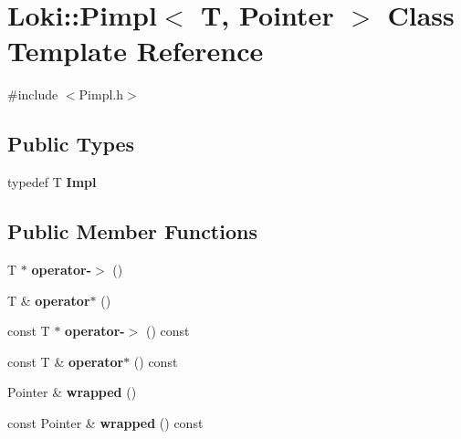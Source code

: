 \hypertarget{classLoki_1_1Pimpl}{}\section{Loki\+:\+:Pimpl$<$ T, Pointer $>$ Class Template Reference}
\label{classLoki_1_1Pimpl}


{\ttfamily \#include $<$Pimpl.\+h$>$}

\subsection*{Public Types}
\begin{DoxyCompactItemize}
\item 
\hypertarget{classLoki_1_1Pimpl_a6ef8111d61b6d3709d8115d8178c8549}{}typedef T {\bfseries Impl}\label{classLoki_1_1Pimpl_a6ef8111d61b6d3709d8115d8178c8549}

\end{DoxyCompactItemize}
\subsection*{Public Member Functions}
\begin{DoxyCompactItemize}
\item 
\hypertarget{classLoki_1_1Pimpl_aa954861b02538f823fa9c63dbe62f096}{}T $\ast$ {\bfseries operator-\/$>$} ()\label{classLoki_1_1Pimpl_aa954861b02538f823fa9c63dbe62f096}

\item 
\hypertarget{classLoki_1_1Pimpl_a2db5a89ac069f09042f17d5c9109fc43}{}T \& {\bfseries operator$\ast$} ()\label{classLoki_1_1Pimpl_a2db5a89ac069f09042f17d5c9109fc43}

\item 
\hypertarget{classLoki_1_1Pimpl_ac1345d40155cb9979741521a9c95282d}{}const T $\ast$ {\bfseries operator-\/$>$} () const \label{classLoki_1_1Pimpl_ac1345d40155cb9979741521a9c95282d}

\item 
\hypertarget{classLoki_1_1Pimpl_a4117838ba4777b52e717a4155404ea2d}{}const T \& {\bfseries operator$\ast$} () const \label{classLoki_1_1Pimpl_a4117838ba4777b52e717a4155404ea2d}

\item 
\hypertarget{classLoki_1_1Pimpl_ae4887f38f36feeb25cf1d9ed5e253a45}{}Pointer \& {\bfseries wrapped} ()\label{classLoki_1_1Pimpl_ae4887f38f36feeb25cf1d9ed5e253a45}

\item 
\hypertarget{classLoki_1_1Pimpl_a9ff98a6a8645f7e79055fe3a39e4f3cb}{}const Pointer \& {\bfseries wrapped} () const \label{classLoki_1_1Pimpl_a9ff98a6a8645f7e79055fe3a39e4f3cb}

\end{DoxyCompactItemize}


